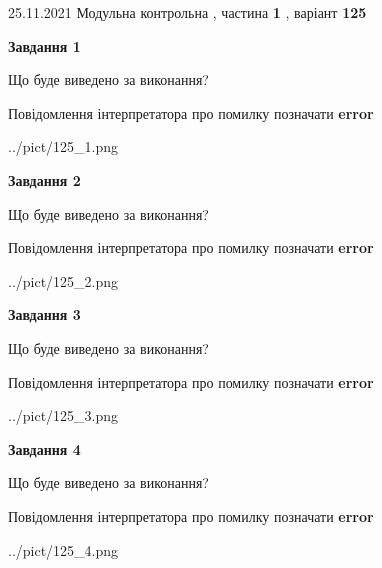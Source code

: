 \documentclass[10pt, ukrainian]{article}
\begin{document}
{25.11.2021 Модульна контрольна , частина \textbf { 1 }, варіант  \No \textbf { 125 }\par}
{
\begin {large}

{\begin {center}\textbf{Завдання 1}\end {center}}\par
Що буде виведено за виконання? \par
Повідомлення інтерпретатора про помилку позначати \textbf{error}

\begin{center}
	{../pict/125_1.png}
\end{center}
\newpage

{\begin {center}\textbf{Завдання 2}\end {center}}\par
Що буде виведено за виконання? \par
Повідомлення інтерпретатора про помилку позначати \textbf{error}

\begin{center}
	{../pict/125_2.png}
\end{center}
\newpage

{\begin {center}\textbf{Завдання 3}\end {center}}\par
Що буде виведено за виконання? \par
Повідомлення інтерпретатора про помилку позначати \textbf{error}

\begin{center}
	{../pict/125_3.png}
\end{center}
\newpage

{\begin {center}\textbf{Завдання 4}\end {center}}\par
Що буде виведено за виконання? \par
Повідомлення інтерпретатора про помилку позначати \textbf{error}

\begin{center}
	{../pict/125_4.png}
\end{center}
\newpage


\end{large}}
\end{document}
